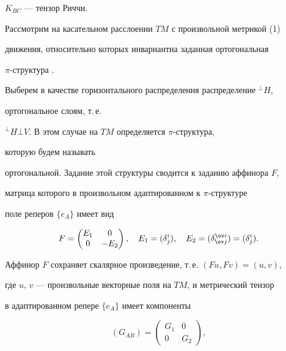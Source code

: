 $K_{BC}$ --- тензор Риччи.





Рассмотрим на касательном расслоении $TM$ с произвольной метрикой (1)


движения, относительно которых инвариантна заданная ортогональная


$\pi$-структура \cite{3}.





Выберем в качестве горизонтального распределения распределение ${}^\bot H$,


ортогональное слоям, т.\,е.


${}^\bot H\bot V$. В этом случае на $TM$ определяется $\pi$-структура,


которую будем называть \cite{3}


ортогональной. Задание этой структуры сводится к заданию аффинора $F$,


матрица которого в произвольном адаптированном к $\pi$-структуре


поле реперов $\{e_A\}$ имеет вид


$$


F=


\begin{pmatrix}


E_1 & 0 \\ 0 & -E_2


\end{pmatrix}


,\quad E_1=(\delta^i_j),\quad E_2=(\delta^{\ov i}_{\ov j})=


(\delta^i_j).


$$


Аффинор $F$ сохраняет скалярное произведение, т.\,е. $(Fu,Fv)=(u,v)$,


где $u$, $v$ --- произвольные векторные поля на $TM$, и метрический тензор


в адаптированном репере $\{e_A\}$ имеет компоненты


\begin{equation}


(G_{AB})=


\begin{pmatrix}


G_1 & 0 \\ 0 & G_2


\end{pmatrix}


,


\end{equation}


